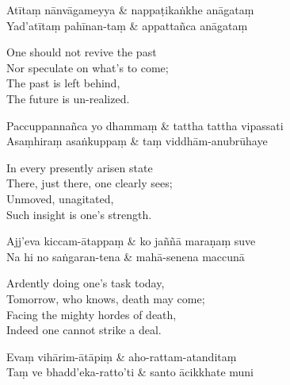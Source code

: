 
\begin{twochants}
  Atītaṃ nānvāgameyya & nappaṭikaṅkhe anāgataṃ \\
  Yad'atītaṃ pahīnan-taṃ & appattañca anāgataṃ \\
\end{twochants}

\begin{english}
  One should not revive the past\\
  Nor speculate on what's to come;\\
  The past is left behind,\\
  The future is un-realized.
\end{english}

\begin{twochants}
  Paccuppannañca yo dhammaṃ & tattha tattha vipassati \\
  Asaṃhiraṃ asaṅkuppaṃ & taṃ viddhām-anubrūhaye \\
\end{twochants}

\begin{english}
  In every presently arisen state\\
  There, just there, one clearly sees;\\
  Unmoved, unagitated,\\
  Such insight is one's strength.
\end{english}

\begin{twochants}
  Ajj'eva kiccam-ātappaṃ & ko jaññā maraṇaṃ suve \\
  Na hi no saṅgaran-tena & mahā-senena maccunā \\
\end{twochants}

\begin{english}
  Ardently doing one's task today,\\
  Tomorrow, who knows, death may come;\\
  Facing the mighty hordes of death,\\
  Indeed one cannot strike a deal.
\end{english}

\begin{twochants}
  Evaṃ vihārim-ātāpiṃ & aho-rattam-atanditaṃ \\
  Taṃ ve bhadd'eka-ratto'ti & santo ācikkhate muni \\
\end{twochants}

